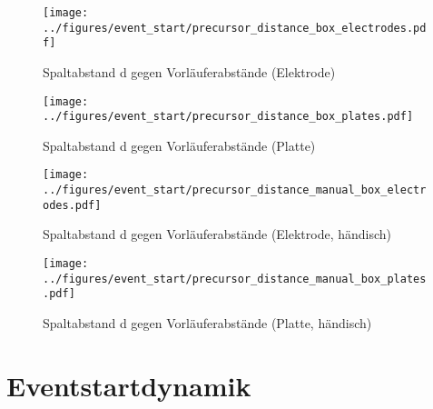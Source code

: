 \begin{figure}[htbp]
    \centering
    \begin{minipage}[t]{0.47\textwidth}
      \centering
      \texttt{[image: ../figures/event\_start/precursor\_distance\_box\_electrodes.pdf]}
      \caption{Spaltabstand d gegen Vorläuferabstände (Elektrode)}
      \label{fig:box-precdistance-electrode}
   \end{minipage}
 \begin{minipage}[t]{0.47\textwidth}
      \centering
      \texttt{[image: ../figures/event\_start/precursor\_distance\_box\_plates.pdf]}
      \caption{Spaltabstand d gegen Vorläuferabstände (Platte)}
      \label{fig:box-precdistance-plate}
  \end{minipage}
\begin{minipage}[t]{0.47\textwidth}
      \centering
      \texttt{[image: ../figures/event\_start/precursor\_distance\_manual\_box\_electrodes.pdf]}
      \caption{Spaltabstand d gegen Vorläuferabstände (Elektrode, händisch)}
      \label{fig:box-precdistance-electrode-hand}
   \end{minipage}
 \begin{minipage}[t]{0.47\textwidth}
      \centering
      \texttt{[image: ../figures/event\_start/precursor\_distance\_manual\_box\_plates.pdf]}
      \caption{Spaltabstand d gegen Vorläuferabstände (Platte, händisch)}
      \label{fig:box-precdistance-plate-hand}
  \end{minipage}

\end{figure}


\section{Eventstartdynamik}


